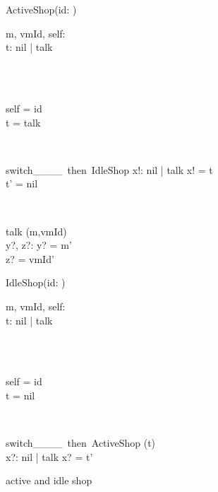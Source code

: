 \begin{figure}[H]
\centering
\begin{sidebyside}
\begin{class}{ActiveShop(id: \integer)}
\\
\begin{state}
m, vmId, self: \integer
\\t: nil | talk
\end{state} 
\\
\begin{init}
\\self = id
\\t = talk
\end{init} 
\\
\begin{op}{switch\_\_\_\_\ then\ IdleShop}
x!: nil | talk
\ST
x! = t
\\t' = nil
\end{op}
\\
\begin{op}{talk}
\Delta (m,vmId)
\\y?, z?: \integer
\ST
y? = m'
\\z? = vmId'
\end{op}
\end{class}
\nextside
\begin{class}{IdleShop(id: \integer)}
\\
\begin{state}
m, vmId, self: \integer
\\t: nil | talk
\end{state} 
\\
\begin{init}
\\self = id
\\t = nil
\end{init} 
\\
\begin{op}{switch\_\_\_\_\ then\ ActiveShop}
\Delta (t)
\\x?: nil | talk
\ST
x? = t'
\end{op}
\end{class}
\end{sidebyside}
\caption{active and idle shop}
\label{fig_oz_active_idle_shop}
\end{figure}
